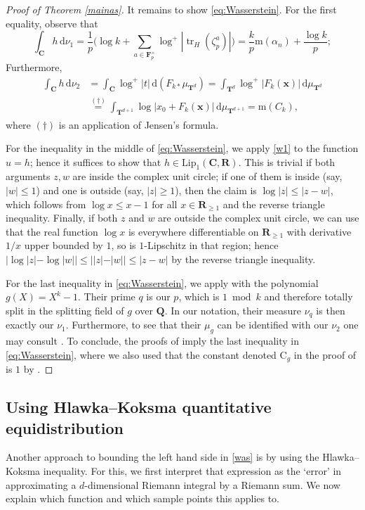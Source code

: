 \documentclass[12pt,reqno]{amsart}
\theoremstyle{definition}
\theoremstyle{plain}
\theoremstyle{definition}
\newcommand{\R}{\mathbf{R}}
\newcommand{\Q}{\mathbf{Q}}
\newcommand{\FF}{\mathbf{F}}
\newcommand{\Cc}{\mathbf{C}}
\newcommand{\T}{\mathbf{T}}
\newcommand\m{\mathrm{m}}
\DeclareMathOperator{\tr}{tr}
\renewcommand{\geq}{\geqslant}
\renewcommand{\leq}{\leqslant}
\renewcommand{\d}{\mathrm{d}}
\begin{document}
\begin{proof}[Proof of Theorem \ref{mainas}]
It remains to show \eqref{eq:Wasserstein}. For the first equality, observe that 
\begin{equation} 
\label{w2}  
\int_\Cc h \, \d \nu_1 = \frac{1}{p} \Big( \log{k} + \sum_{a \in \FF_p^{\times}} \log^+ |\tr_H(\zeta_p^a)| \Big) = \frac{k}{p} \m(\alpha_n) + \frac{\log{k}}{p};
\end{equation} 
Furthermore, 
\begin{align} 
\label{w3} 
\int_\Cc h \, \d \nu_2 &= \int_\Cc \log^+|t| \, \d(F_{k\ast} \mu_{\T^d}) = \int_{\T^d} \log^+|F_k(\mathbf x)|\, \d \mu_{\T^d} \nonumber \\ 
&\overset{(\dagger)}{=} \int_{\T^{d+1}} \log | x_0 + F_k(\mathbf x)|\, \d \mu_{\T^{d+1}} = \m(C_k), 
\end{align} 
where $(\dagger)$ is an application of Jensen's formula.


For the inequality in the middle of \eqref{eq:Wasserstein}, we apply \eqref{w1} to the function $u=h$; hence it suffices to show that $h \in \mathrm{Lip_1}(\Cc,\R)$. This is trivial if both arguments $z,w$ are inside the complex unit circle; if one of them is inside (say, $|w| \leq 1$) and one is outside (say, $|z| \geq 1$), then the claim is $\log|z| \leq  |z-w|$, which follows from $\log x \leq x-1$ for all $x \in \R_{\geq 1}$ and the reverse triangle inequality. Finally, if both $z$ and $w$ are outside the complex unit circle, we can use that the real function $\log x$ is everywhere differentiable on $\R_{\geq 1}$ with derivative $1/x$ upper bounded by $1$, so is $1$-Lipschitz in that region; hence $|\log |z| - \log |w|| \leq ||z|-|w|| \leq |z-w|$ by the reverse triangle inequality. 

For the last inequality in \eqref{eq:Wasserstein}, we apply \cite[Corollary~3.6]{KU} with the polynomial $g(X) = X^k-1$. Their prime $q$ is our $p$, which is $1 \bmod{k}$ and therefore totally split in the splitting field of $g$ over $\Q$. In our notation, their measure $\nu_q$ is then exactly our $\nu_1$. Furthermore, to see that their $\mu_g$ can be identified with our $\nu_2$ one may consult \cite[Section~3]{KU2}. To conclude, the proofs of \cite[Prop.~3.4 and Cor.~3.6]{KU} imply the last inequality in \eqref{eq:Wasserstein}, where we also used that the constant denoted $\mathrm{C}_g$ in the proof of \cite[Prop.~3.4]{KU} is $1$ by \cite[Lem.~3.3]{KU}.
\end{proof} 

\subsection{Using Hlawka--Koksma quantitative equidistribution} 
Another approach to bounding the left hand side in \eqref{was} is by using the Hlawka--Koksma inequality. For this, we first interpret that expression as the `error' in approximating a $d$-dimensional Riemann integral by a Riemann sum. We now explain which function and which sample points this applies to. 
\end{document}
